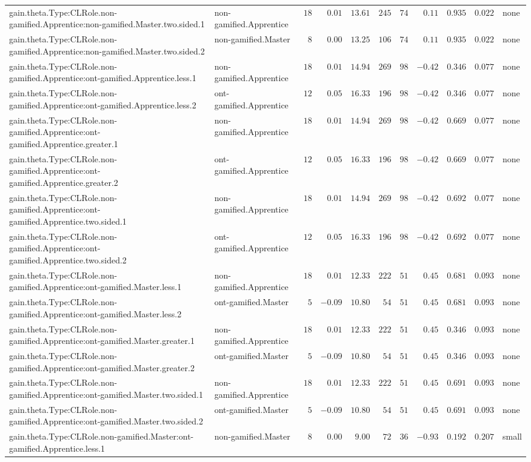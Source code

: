 \documentclass[6pt]{article}
\begin{document}
\begin{landscape}
{\begin{longtable}{llrrrrrrrrl}
gain.theta.Type:CLRole.non-gamified.Apprentice:non-gamified.Master.two.sided.1&non-gamified.Apprentice&$18$&$ 0.01$&$13.61$&$245$&$ 74$&$ 0.11$&$0.935$&$0.022$&none\tabularnewline
gain.theta.Type:CLRole.non-gamified.Apprentice:non-gamified.Master.two.sided.2&non-gamified.Master&$ 8$&$ 0.00$&$13.25$&$106$&$ 74$&$ 0.11$&$0.935$&$0.022$&none\tabularnewline
gain.theta.Type:CLRole.non-gamified.Apprentice:ont-gamified.Apprentice.less.1&non-gamified.Apprentice&$18$&$ 0.01$&$14.94$&$269$&$ 98$&$-0.42$&$0.346$&$0.077$&none\tabularnewline
gain.theta.Type:CLRole.non-gamified.Apprentice:ont-gamified.Apprentice.less.2&ont-gamified.Apprentice&$12$&$ 0.05$&$16.33$&$196$&$ 98$&$-0.42$&$0.346$&$0.077$&none\tabularnewline
gain.theta.Type:CLRole.non-gamified.Apprentice:ont-gamified.Apprentice.greater.1&non-gamified.Apprentice&$18$&$ 0.01$&$14.94$&$269$&$ 98$&$-0.42$&$0.669$&$0.077$&none\tabularnewline
gain.theta.Type:CLRole.non-gamified.Apprentice:ont-gamified.Apprentice.greater.2&ont-gamified.Apprentice&$12$&$ 0.05$&$16.33$&$196$&$ 98$&$-0.42$&$0.669$&$0.077$&none\tabularnewline
gain.theta.Type:CLRole.non-gamified.Apprentice:ont-gamified.Apprentice.two.sided.1&non-gamified.Apprentice&$18$&$ 0.01$&$14.94$&$269$&$ 98$&$-0.42$&$0.692$&$0.077$&none\tabularnewline
gain.theta.Type:CLRole.non-gamified.Apprentice:ont-gamified.Apprentice.two.sided.2&ont-gamified.Apprentice&$12$&$ 0.05$&$16.33$&$196$&$ 98$&$-0.42$&$0.692$&$0.077$&none\tabularnewline
gain.theta.Type:CLRole.non-gamified.Apprentice:ont-gamified.Master.less.1&non-gamified.Apprentice&$18$&$ 0.01$&$12.33$&$222$&$ 51$&$ 0.45$&$0.681$&$0.093$&none\tabularnewline
gain.theta.Type:CLRole.non-gamified.Apprentice:ont-gamified.Master.less.2&ont-gamified.Master&$ 5$&$-0.09$&$10.80$&$ 54$&$ 51$&$ 0.45$&$0.681$&$0.093$&none\tabularnewline
gain.theta.Type:CLRole.non-gamified.Apprentice:ont-gamified.Master.greater.1&non-gamified.Apprentice&$18$&$ 0.01$&$12.33$&$222$&$ 51$&$ 0.45$&$0.346$&$0.093$&none\tabularnewline
gain.theta.Type:CLRole.non-gamified.Apprentice:ont-gamified.Master.greater.2&ont-gamified.Master&$ 5$&$-0.09$&$10.80$&$ 54$&$ 51$&$ 0.45$&$0.346$&$0.093$&none\tabularnewline
gain.theta.Type:CLRole.non-gamified.Apprentice:ont-gamified.Master.two.sided.1&non-gamified.Apprentice&$18$&$ 0.01$&$12.33$&$222$&$ 51$&$ 0.45$&$0.691$&$0.093$&none\tabularnewline
gain.theta.Type:CLRole.non-gamified.Apprentice:ont-gamified.Master.two.sided.2&ont-gamified.Master&$ 5$&$-0.09$&$10.80$&$ 54$&$ 51$&$ 0.45$&$0.691$&$0.093$&none\tabularnewline
gain.theta.Type:CLRole.non-gamified.Master:ont-gamified.Apprentice.less.1&non-gamified.Master&$ 8$&$ 0.00$&$ 9.00$&$ 72$&$ 36$&$-0.93$&$0.192$&$0.207$&small\tabularnewline

\end{longtable}}
\end{landscape}
\end{document}
